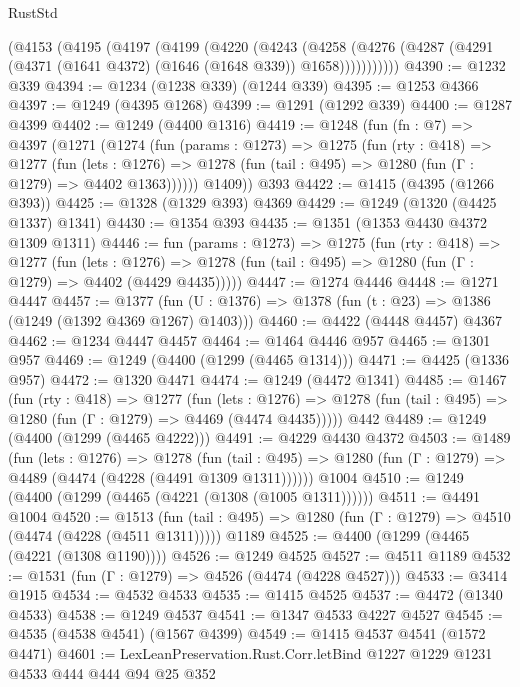 \begin{lexlean}{RustStd}
\begin{coremodule}
{\begin{coremodule}
{{{{{{{{{{{    (@4153
      (@4195
        (@4197
          (@4199
            (@4220
              (@4243
                (@4258
                  (@4276 (@4287 (@4291 (@4371 (@1641 @4372) (@1646 (@1648 @339)) @1658)))))))))))
@4390 := @1232 @339
@4394 := @1234 (@1238 @339) (@1244 @339)
@4395 := @1253 @4366
@4397 := @1249 (@4395 @1268)
@4399 := @1291 (@1292 @339)
@4400 := @1287 @4399
@4402 := @1249 (@4400 @1316)
@4419 := @1248
    (fun (fn : @7) =>
    @4397
      (@1271
        (@1274
          (fun (params : @1273) =>
          @1275
            (fun (rty : @418) =>
            @1277
              (fun (lets : @1276) =>
              @1278 (fun (tail : @495) => @1280 (fun (Γ : @1279) => @4402 @1363))))))
        @1409))
    @393
@4422 := @1415 (@4395 (@1266 @393))
@4425 := @1328 (@1329 @393) @4369
@4429 := @1249 (@1320 (@4425 @1337) @1341)
@4430 := @1354 @393
@4435 := @1351 (@1353 @4430 @4372 @1309 @1311)
@4446 := fun (params : @1273) =>
  @1275
    (fun (rty : @418) =>
    @1277
      (fun (lets : @1276) =>
      @1278 (fun (tail : @495) => @1280 (fun (Γ : @1279) => @4402 (@4429 @4435)))))
@4447 := @1274 @4446
@4448 := @1271 @4447
@4457 := @1377 (fun (U : @1376) => @1378 (fun (t : @23) => @1386 (@1249 (@1392 @4369 @1267) @1403)))
@4460 := @4422 (@4448 @4457) @4367
@4462 := @1234 @4447 @4457
@4464 := @1464 @4446 @957
@4465 := @1301 @957
@4469 := @1249 (@4400 (@1299 (@4465 @1314)))
@4471 := @4425 (@1336 @957)
@4472 := @1320 @4471
@4474 := @1249 (@4472 @1341)
@4485 := @1467
    (fun (rty : @418) =>
    @1277
      (fun (lets : @1276) =>
      @1278 (fun (tail : @495) => @1280 (fun (Γ : @1279) => @4469 (@4474 @4435)))))
    @442
@4489 := @1249 (@4400 (@1299 (@4465 @4222)))
@4491 := @4229 @4430 @4372
@4503 := @1489
    (fun (lets : @1276) =>
    @1278
      (fun (tail : @495) => @1280 (fun (Γ : @1279) => @4489 (@4474 (@4228 (@4491 @1309 @1311))))))
    @1004
@4510 := @1249 (@4400 (@1299 (@4465 (@4221 (@1308 (@1005 @1311))))))
@4511 := @4491 @1004
@4520 := @1513
    (fun (tail : @495) => @1280 (fun (Γ : @1279) => @4510 (@4474 (@4228 (@4511 @1311)))))
    @1189
@4525 := @4400 (@1299 (@4465 (@4221 (@1308 @1190))))
@4526 := @1249 @4525
@4527 := @4511 @1189
@4532 := @1531 (fun (Γ : @1279) => @4526 (@4474 (@4228 @4527)))
@4533 := @3414 @1915
@4534 := @4532 @4533
@4535 := @1415 @4525
@4537 := @4472 (@1340 @4533)
@4538 := @1249 @4537
@4541 := @1347 @4533 @4227 @4527
@4545 := @4535 (@4538 @4541) (@1567 @4399)
@4549 := @1415 @4537 @4541 (@1572 @4471)
@4601 := LexLeanPreservation.Rust.Corr.letBind
    @1227
    @1229
    @1231
    @4533
    @444
    @444
    @94
    @25
    @352
}}}}}}}}}}}
\end{coremodule}}
\end{coremodule}
\end{lexlean}

